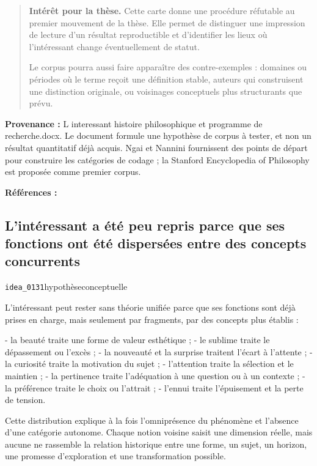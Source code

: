 \documentclass[10pt,a4paper]{article}
\begin{document}
\begin{quote}
\textbf{Intérêt pour la thèse.} Cette carte donne une procédure réfutable au premier mouvement de la thèse. Elle permet de distinguer une impression de lecture d'un résultat reproductible et d'identifier les lieux où l'intéressant change éventuellement de statut.

Le corpus pourra aussi faire apparaître des contre-exemples : domaines ou périodes où le terme reçoit une définition stable, auteurs qui construisent une distinction originale, ou voisinages conceptuels plus structurants que prévu.
\end{quote}
{\footnotesize\color{metadata}\textbf{Provenance :} L interessant histoire philosophique et programme de recherche.docx. Le document formule une hypothèse de corpus à tester, et non un résultat quantitatif déjà acquis. Ngai et Nannini fournissent des points de départ pour construire les catégories de codage ; la Stanford Encyclopedia of Philosophy est proposée comme premier corpus.\par}
{\footnotesize\color{metadata}\textbf{Références :} \parencite{ngai2008merely,nannini2018interesting}\par}

\subsection{L'intéressant a été peu repris parce que ses fonctions ont été dispersées entre des concepts concurrents}
{\small\color{metadata} \texttt{idea\_0131}\quad\textbullet\quad hypothèse\quad\textbullet\quad conceptuelle\par}

L'intéressant peut rester sans théorie unifiée parce que ses fonctions sont déjà prises en charge, mais seulement par fragments, par des concepts plus établis :

- la beauté traite une forme de valeur esthétique ; - le sublime traite le dépassement ou l'excès ; - la nouveauté et la surprise traitent l'écart à l'attente ; - la curiosité traite la motivation du sujet ; - l'attention traite la sélection et le maintien ; - la pertinence traite l'adéquation à une question ou à un contexte ; - la préférence traite le choix ou l'attrait ; - l'ennui traite l'épuisement et la perte de tension.

Cette distribution explique à la fois l'omniprésence du phénomène et l'absence d'une catégorie autonome. Chaque notion voisine saisit une dimension réelle, mais aucune ne rassemble la relation historique entre une forme, un sujet, un horizon, une promesse d'exploration et une transformation possible.
\end{document}
